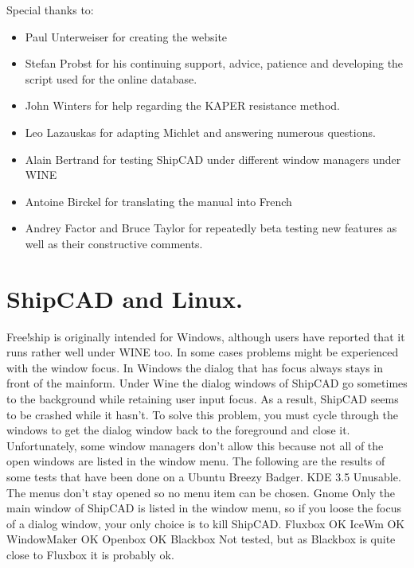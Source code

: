 \documentclass[12pt]{article}
\begin{document}
Special thanks to:
\begin{itemize}
  \item Paul Unterweiser for creating the website
  \item Stefan Probst for his continuing support, advice, patience and developing the script
used for the online database.
  \item John Winters for help regarding the KAPER resistance method.
  \item Leo Lazauskas for adapting Michlet and answering numerous questions.
  \item Alain Bertrand for testing ShipCAD under different window managers under WINE
  \item Antoine Birckel for translating the manual into French
  \item Andrey Factor and Bruce Taylor for repeatedly beta testing new features as well as
their constructive comments.
\end{itemize}

\section{ShipCAD and Linux.}

Free!ship is originally intended for Windows, although users have
reported that it runs rather well under WINE too. In some cases
problems might be experienced with the window focus. In Windows the
dialog that has focus always stays in front of the mainform. Under
Wine the dialog windows of ShipCAD go sometimes to the background
while retaining user input focus. As a result, ShipCAD seems to be
crashed while it hasn't. To solve this problem, you must cycle through
the windows to get the dialog window back to the foreground and close
it. Unfortunately, some window managers don't allow this because not
all of the open windows are listed in the window menu. The following
are the results of some tests that have been done on a Ubuntu Breezy
Badger.  KDE 3.5 Unusable. The menus don't stay opened so no menu item
can be chosen.  Gnome Only the main window of ShipCAD is listed in the
window menu, so if you loose the focus of a dialog window, your only
choice is to kill ShipCAD.  Fluxbox OK IceWm OK WindowMaker OK Openbox
OK Blackbox Not tested, but as Blackbox is quite close to Fluxbox it
is probably ok.

\pagebreak
\end{document}
